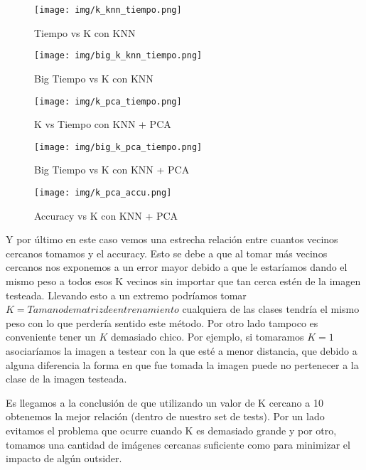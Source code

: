 \begin{figure}[H]
	\centering	\texttt{[image: img/k\_knn\_tiempo.png]}
	\caption{Tiempo vs K con KNN}
	\label{fig:K vs Tiempo con KNN}
\end{figure}
\begin{figure}[H]
	\centering	\texttt{[image: img/big\_k\_knn\_tiempo.png]}
	\caption{Big Tiempo vs K con KNN}
	\label{fig:Big K vs Tiempo con KNN}
\end{figure}





\begin{figure}[H]
	\centering	\texttt{[image: img/k\_pca\_tiempo.png]}
	\caption{K vs Tiempo con KNN + PCA}
	\label{fig:K vs Tiempo con KNN + PCA}
\end{figure}
\begin{figure}[H]
	\centering	\texttt{[image: img/big\_k\_pca\_tiempo.png]}
	\caption{Big Tiempo vs K con KNN + PCA}
	\label{fig:Big K vs Tiempo con KNN + PCA}
\end{figure}


\begin{figure}[H]
	\centering
	\texttt{[image: img/k\_pca\_accu.png]}
	\caption{Accuracy vs K con KNN + PCA}
	\label{fig:K vs Accuracy con KNN + PCA}
\end{figure}

Y por último en este caso vemos una estrecha relación entre cuantos vecinos cercanos tomamos y el accuracy.
Esto se debe a que al tomar más vecinos cercanos nos exponemos a un error mayor debido a que le estaríamos dando el mismo peso a todos esos K vecinos sin importar que tan cerca estén de la imagen testeada.
Llevando esto a un extremo podríamos tomar $K = Tamano de matriz de entrenamiento$  cualquiera de las clases tendría el mismo peso con lo que perdería sentido este método.
Por otro lado tampoco es conveniente tener un $K$ demasiado chico. Por ejemplo, si tomaramos $K = 1$ asociaríamos la imagen a testear con la que esté a menor distancia, que debido a alguna diferencia la forma en que fue tomada la imagen puede no pertenecer a la clase de la imagen testeada.

Es llegamos a la conclusión de que utilizando un valor de K cercano a 10 obtenemos la mejor relación (dentro de nuestro set de tests).
Por un lado evitamos el problema que ocurre cuando K es demasiado grande y por otro, tomamos una cantidad de imágenes cercanas suficiente como para minimizar el impacto de algún outsider.
